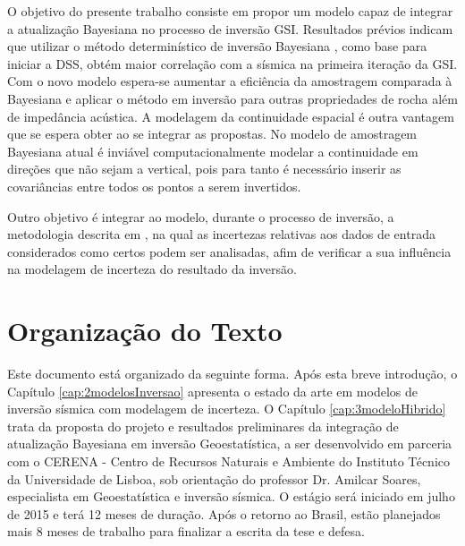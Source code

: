 O objetivo do presente trabalho consiste em propor um modelo capaz de integrar a
atualização Bayesiana no processo de inversão GSI. Resultados prévios indicam
que utilizar o método determinístico de inversão Bayesiana
\citep{Buland01012003}, como base para iniciar a DSS, obtém maior correlação com
a sísmica na primeira iteração da GSI. Com o novo modelo espera-se aumentar a
eficiência da amostragem comparada à Bayesiana e aplicar o método em inversão
para outras propriedades de rocha além de impedância acústica. A modelagem da
continuidade espacial é outra vantagem que se espera obter ao se integrar as
propostas. No modelo de amostragem Bayesiana atual é inviável computacionalmente
modelar a continuidade em direções que não sejam a vertical, pois para tanto é
necessário inserir as covariâncias entre todos os pontos a serem invertidos.

Outro objetivo é integrar ao modelo, durante o processo de inversão, a
metodologia descrita em \cite{caers_distance_kernels_MDS}, na qual as incertezas
relativas aos dados de entrada considerados como certos podem ser analisadas,
afim de verificar a sua influência na modelagem de incerteza do resultado da
inversão.


\section{Organização do Texto}

Este documento está organizado da seguinte forma. Após esta breve introdução, o
Capítulo \ref{cap:2modelosInversao} apresenta o estado da arte em modelos de
inversão sísmica com modelagem de incerteza. O Capítulo \ref{cap:3modeloHibrido}
trata da proposta do projeto e resultados preliminares da integração de
atualização Bayesiana em inversão Geoestatística, a ser desenvolvido em parceria
com o CERENA - Centro de Recursos Naturais e Ambiente do Instituto Técnico da
Universidade de Lisboa, sob orientação do professor Dr. Amilcar Soares,
especialista em Geoestatística e inversão sísmica. O estágio será iniciado em
julho de 2015 e terá 12 meses de duração. Após o retorno ao Brasil, estão
planejados mais 8 meses de trabalho para finalizar a escrita da tese e defesa.

